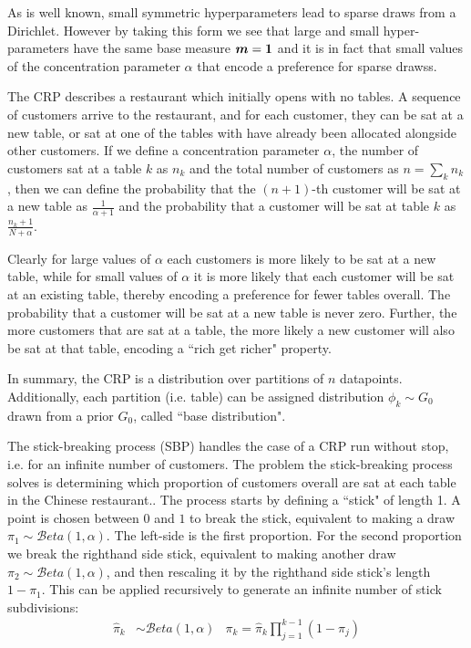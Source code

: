 As is well known, small symmetric hyperparameters lead to sparse draws from a Dirichlet. However by taking this form we see that large and small hyper-parameters have the same base measure $\bm m=\bm 1$ and it is in fact that small values of the concentration parameter $\alpha$ that encode a preference for sparse drawss.

The CRP\cite{Neal2000} describes a restaurant which initially opens with no tables. A sequence of customers arrive to the restaurant, and for each customer, they can be sat at a new table, or sat at one of the tables with have already been allocated alongside other customers. If we define a concentration parameter $\alpha$, the number of customers sat at a table $k$ as $n_k$ and the total number of customers as $n = \sum_k n_k$, then we can define the probability that the $(n+1)$-th customer will be sat at a new table as $\frac{1}{\alpha + 1}$ and the probability that a customer will be sat at table $k$ as $\frac{n_k + 1}{N + \alpha}$. 

Clearly for large values of $\alpha$ each customers is more likely to be sat at a new table, while for small values of $\alpha$ it is more likely that each customer will be sat at an existing table, thereby encoding a preference for fewer tables overall. The probability that a customer will be sat at a new table is never zero. Further, the more customers that are sat at a table, the more likely a new customer will also be sat at that table, encoding a ``rich get richer" property.

In summary, the CRP is a distribution over partitions of $n$ datapoints. Additionally, each  partition (i.e. table) can be assigned distribution $\phi_k \sim G_0$ drawn from a prior $G_0$, called ``base distribution".

The stick-breaking process (SBP) handles the case of a CRP run without stop, i.e. for an infinite number of customers. The problem the stick-breaking process solves is determining which proportion of customers overall are sat at each table in the Chinese restaurant.. The process starts by defining a ``stick" of length 1. A point is chosen between $0$ and $1$ to break the stick, equivalent to making a draw $\pi_1 \sim \mathcal{B}eta\left(1, \alpha\right)$. The left-side is the first proportion. For the second proportion we break the righthand side stick, equivalent to making another draw $\pi_2 \sim \mathcal{B}eta\left(1, \alpha\right)$, and then rescaling it by the righthand side stick's length $1-\pi_1$. This can be applied recursively to generate an infinite number of stick subdivisions:
\begin{align}
\hat{\pi}_k & \sim \mathcal{B}eta\left(1, \alpha\right) & \pi_k = \hat{\pi}_k \prod_{j=1}^{k-1} (1 - \pi_j)
\end{align}

